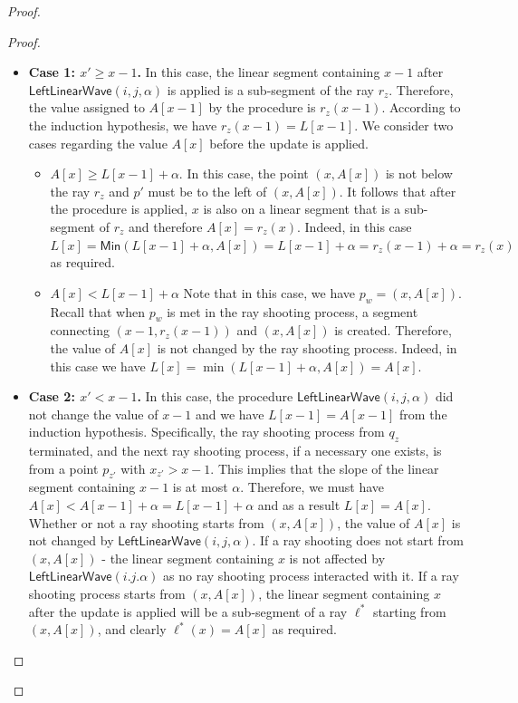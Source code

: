 \documentclass[10pt,a4paper]{article}
\newcommand{\LLW}{\mathsf{LeftLinearWave}}
\newcommand{\Min}{\mathsf{Min}}
\newcommand{\ray}{r}
\begin{document}
\begin{proof}
\begin{proof}
\begin{itemize}
    \item \textbf{Case 1: $x' \ge x-1$.}
    In this case, the linear segment containing $x-1$ after $\LLW(i,j,\alpha)$ is applied is a sub-segment of the ray $\ray_z$. 
    Therefore, the value assigned to $A[x-1]$ by the procedure is $\ray_z(x-1)$.
    According to the induction hypothesis, we have $\ray_z(x-1) = L[x-1]$.
    We consider two cases regarding the value $A[x]$ before the update is applied.
    \begin{itemize}
        \item \textbf{$A[x] \ge L[x-1] + \alpha$}. In this case, the point $(x,A[x])$ is not below the ray $\ray_z$ and $p'$ must be to the left of $(x,A[x])$.
        It follows that after the procedure is applied, $x$ is also on a linear segment that is a sub-segment of $\ray_z$ and therefore $A[x] = \ray_z(x)$. 
        Indeed, in this case $L[x] = \Min(L[x-1] + \alpha,A[x]) = L[x-1] + \alpha = \ray_z(x-1) + \alpha = \ray_z(x)$ as required.
        \item \textbf{$A[x] < L[x-1] + \alpha$} Note that in this case, we have $p_w = (x,A[x])$.
        Recall that when $p_w$ is met in the ray shooting process, a segment connecting $(x-1,\ray_z(x-1))$ and $(x,A[x])$ is created.
        Therefore, the value of $A[x]$ is not changed by the ray shooting process.
        Indeed, in this case we have $L[x] = \min(L[x-1] + \alpha,A[x]) = A[x]$.
    \end{itemize}
    \item \textbf{Case 2: $x' < x-1$.}
    In this case, the procedure $\LLW(i,j,\alpha)$ did not change the value of $x-1$ and we have $L[x-1] = A[x-1]$ from the induction hypothesis.
    Specifically, the ray shooting process from $q_z$ terminated, and the next ray shooting process, if a necessary one exists, is from a point $p_{z'}$ with $x_{z'} > x-1$.
    This implies that the slope of the linear segment containing $x-1$ is at most $\alpha$.
    Therefore, we must have $A[x]< A[x-1] + \alpha =L[x-1] + \alpha$ and as a result $L[x] = A[x]$.
    Whether or not a ray shooting starts from $(x,A[x])$, the value of $A[x]$ is not changed by $\LLW(i,j,\alpha)$.
    If a ray shooting does not start from $(x,A[x])$ - the linear segment containing $x$ is not affected by $\LLW(i.j.\alpha)$ as no ray shooting process interacted with it.
    If a ray shooting process starts from $(x,A[x])$, the linear segment containing $x$ after the update is applied will be a sub-segment of a ray $\ell^*$ starting from $(x,A[x])$, and clearly $\ell^*(x) = A[x]$ as required.\qedhere 
\end{itemize}
\end{proof}


\end{proof}
\end{document}
